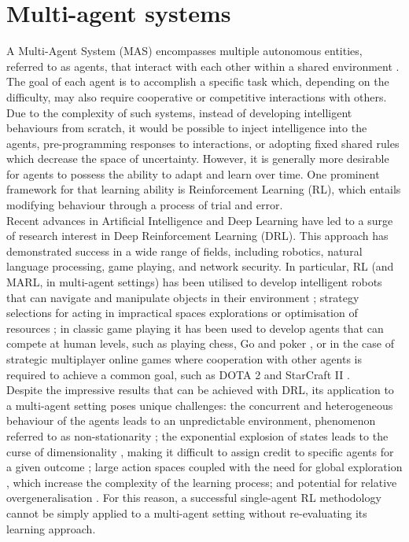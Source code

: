 \documentclass[a4paper,singleside,12pt]{report} %
\begin{document}
\section{Multi-agent systems}\label{multi-agent-systems}

A Multi-Agent System (MAS) encompasses multiple autonomous entities, referred to as agents, that interact with each other within a shared environment \cite{weiss1999multiagent}. The goal of each agent is to accomplish a specific task which, depending on the difficulty, may also require cooperative or competitive interactions with others. Due to the complexity of such systems, instead of developing intelligent behaviours from scratch, it would be possible to inject intelligence into the agents, pre-programming responses to interactions, or adopting fixed shared rules which decrease the space of uncertainty. However, it is generally more desirable for agents to possess the ability to adapt and learn over time. One prominent framework for that learning ability is Reinforcement Learning (RL), which entails modifying behaviour through a process of trial and error.\\
Recent advances in Artificial Intelligence and Deep Learning have led to a surge of research interest in Deep Reinforcement Learning (DRL). This approach has demonstrated success in a wide range of fields, including robotics, natural language processing, game playing, and network security. In particular, RL (and MARL, in multi-agent settings) has been utilised to develop intelligent robots that can navigate and manipulate objects in their environment \cite{Albrecht2017AutonomousAM}; strategy selections for acting in impractical spaces explorations \cite{Silva2019ASO} or optimisation of resources \cite{Mnih2015HumanlevelCT}; in classic game playing it has been used to develop agents that can compete at human levels, such as playing chess, Go and poker \cite{Silver2016MasteringTG, Silver2017MasteringTG, Brown2018SuperhumanAF}, or in the case of strategic multiplayer online games where cooperation with other agents is required to achieve a common goal, such as DOTA 2 \cite{OpenAI_dota} and StarCraft II \cite{Vinyals2019GrandmasterLI}.\\
Despite the impressive results that can be achieved with DRL, its application to a multi-agent setting poses unique challenges: the concurrent and heterogeneous behaviour of the agents leads to an unpredictable environment, phenomenon referred to as non-stationarity \cite{Shoham2007IfML, Buoniu2008ACS, HernandezLeal2017ASO}; the exponential explosion of states leads to the curse of dimensionality \cite{Shoham2007IfML, Buoniu2008ACS}, making it difficult to assign credit to specific agents for a given outcome \cite{Wolpert2001OptimalPF, Agogino2004UnifyingTA}; large action spaces coupled with the need for global exploration \cite{Matignon2012IndependentRL}, which increase the complexity of the learning process; and potential for relative overgeneralisation \cite{Fulda2007PredictingAP, Wei2016LenientLI, Palmer2017LenientMD}. For this reason, a successful single-agent RL methodology cannot be simply applied to a multi-agent setting without re-evaluating its learning approach.
\end{document}
